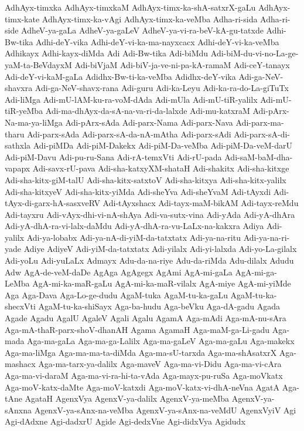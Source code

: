 {AdhAyx-timxka
AdhAyx-timxkaM
AdhAyx-timx-ka-shA-satxrX-gaLu
AdhAyx-timx-kate
AdhAyx-timx-ka-vAgi
AdhAyx-timx-ka-veMba
Adha-ri-sida
Adha-ri-side
AdheV-ya-gaLa
AdheV-ya-gaLeV
AdheV-ya-vi-ra-beV-kA-gu-tatxde
Adhi-Bw-tika
Adhi-deY-vika
Adhi-deY-vi-ka-ma-nayxcacx
Adhi-deY-vi-ka-veMba
Adhikayx
Adhi-kayx-diMda
Adi
Adi-Bw-tika
Adi-biMdu
Adi-biM-du-vi-no-La-ge-yaM-ta-BeVdayxM
Adi-biVjaM
Adi-biV-ja-ve-ni-pa-kA-ramaM
Adi-ceY-tanayx
Adi-deY-vi-kaM-gaLa
Adidhx-Bw-ti-ka-veMba
Adidhx-deY-vika
Adi-ga-NeV-shavxra
Adi-ga-NeV-shavx-rana
Adi-guru
Adi-ka-Leyu
Adi-ka-ra-do-La-giTuTx
Adi-liMga
Adi-mU-lAM-ku-ra-voM-dAda
Adi-mUla
Adi-mU-tiR-yalilx
Adi-mU-tiR-yeMba
Adi-ma-dhAyx-da-sA-na-va-ri-da-lalxde
Adi-mu-katxraM
Adi-pArx-Na-ma-ya-liMga
Adi-pArx-sAda
Adi-parx-Nama
Adi-parx-Nava
Adi-parx-ma-tharu
Adi-parx-sAda
Adi-parx-sA-da-nA-mAtha
Adi-parx-sAdi
Adi-parx-sA-di-sathxla
Adi-piMDa
Adi-piM-Dakekx
Adi-piM-Da-veMba
Adi-piM-Da-veM-darU
Adi-piM-Davu
Adi-pu-ru-Sana
Adi-rA-temxVti
Adi-rU-pada
Adi-saM-baM-dha-vapapx
Adi-savx-rU-pava
Adi-sha-katxyXM-shataH
Adi-shakitx
Adi-sha-kitxge
Adi-sha-kitx-giM-talU
Adi-sha-kitx-satxtoV
Adi-sha-kitxya
Adi-sha-kitx-yalilx
Adi-sha-kitxyeV
Adi-sha-kitx-yiMda
Adi-sheYva
Adi-sheYvaM
Adi-tAyxdi
Adi-tAyx-di-garx-hA-sasxveRV
Adi-tAyxshacx
Adi-tayx-maM-bikAM
Adi-tayx-reMdu
Adi-tayxru
Adi-vAyx-dhi-vi-nA-shAya
Adi-va-sutx-vina
Adi-yAda
Adi-yA-dhAra
Adi-yA-dhA-ra-vi-lalx-daMdu
Adi-yA-dhA-ra-vu-LaLx-na-kakxra
Adiya
Adi-yalilx
Adi-ya-lobabx
Adi-ya-nA-di-yiM-da-tatxtatx
Adi-ya-na-ritu
Adi-ya-na-ri-yade
Adiye
AdiyeV
Adi-yiM-da-tatxtatx
Adi-yilalx
Adi-yi-lalxda
Adi-yo-La-gilalx
Adi-yoLu
Adi-yuLaLx
Admayx
Adu-da-na-riye
Adu-da-riMda
Adu-dilalx
Adudu
Adw
AgA-de-veM-daDe
AgAga
AgAgegx
AgAmi
AgA-mi-gaLa
AgA-mi-ga-LeMba
AgA-mi-ka-maR-gaLu
AgA-mi-ka-maR-vilalx
AgA-miye
AgA-mi-yiMde
Aga
Aga-Dava
Aga-Lo-ge-dudu
AgaM-tuka
AgaM-tu-ka-gaLu
AgaM-tu-ka-shecxVti
AgaM-tu-ka-shiSayx
Aga-ba-hudu
Aga-beVku
Aga-dA-gadu
Agada
Agade
Agadu
AgalU
AgaleV
Agali
Agalu
AgamA
Aga-mAdi
Aga-mA-nu-sAra
Aga-mA-thaR-parx-shoV-dhanAH
Agama
AgamaH
Aga-maM-ga-Li-gadu
Aga-mada
Aga-ma-gaLa
Aga-ma-ga-Lalilx
Aga-ma-gaLeV
Aga-ma-gaLu
Aga-makekx
Aga-ma-liMga
Aga-ma-ma-ta-diMda
Aga-ma-sU-tarxda
Aga-ma-shAsatxrX
Aga-mashacx
Aga-ma-tarx-ya-dalilx
Aga-maveV
Aga-ma-vi-Didu
Aga-ma-vi-cAra
Aga-ma-vi-daraM
Aga-ma-vi-ra-hi-ta-vAda
Aga-mayx-pu-ruSa
Aga-moVkatx
Aga-moV-katx-daMte
Aga-moV-katxdi
Aga-moV-katx-vi-dhA-neVna
AgatA
Aga-tAne
AgataH
AgenxVya
AgenxV-ya-dalilx
AgenxV-ya-meMba
AgenxV-ya-sAnxna
AgenxV-ya-sAnx-na-veMba
AgenxV-ya-sAnx-na-veMdU
AgenxVyiV
Agi
Agi-dAdxne
Agi-dadxrU
Agide
Agi-dedxVne
Agi-didxVya
Agidudx
}
